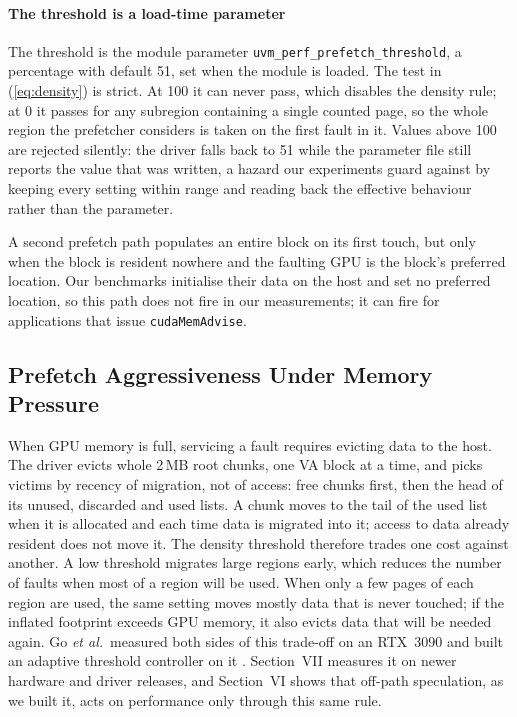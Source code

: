 \paragraph{The threshold is a load-time parameter}
The threshold is the module parameter \texttt{uvm\_perf\_prefetch\_threshold},
a percentage with default 51, set when the module is loaded. The test in
(\ref{eq:density}) is strict. At 100 it can never pass, which disables the
density rule; at 0 it passes for any subregion containing a single counted
page, so the whole region the prefetcher considers is taken on the first
fault in it. Values above 100 are rejected silently: the driver falls back to
51 while the parameter file still reports the value that was written, a
hazard our experiments guard against by keeping every setting within range
and reading back the effective behaviour rather than the parameter.

A second prefetch path populates an entire block on its first touch, but only
when the block is resident nowhere and the faulting GPU is the block's
preferred location. Our benchmarks initialise their data on the host and set
no preferred location, so this path does not fire in our measurements; it
can fire for applications that issue \texttt{cudaMemAdvise}.

\subsection{Prefetch Aggressiveness Under Memory Pressure}
\label{sec:bg-oversub}

When GPU memory is full, servicing a fault requires evicting data to the
host. The driver evicts whole 2\,MB root chunks, one VA block at a time, and
picks victims by recency of migration, not of access: free chunks first, then
the head of its unused, discarded and used lists. A chunk moves to the tail of
the used list when it is allocated and each time data is migrated into it;
access to data already resident does not move it. The density threshold
therefore trades one cost against another. A low threshold migrates large
regions early, which reduces the number of faults when most of a region will
be used. When only a few pages of each region are used, the same setting
moves mostly data that is never touched; if the inflated footprint exceeds
GPU memory, it also evicts data that will be needed again. Go
\emph{et al.}\ measured both sides of this trade-off on an RTX~3090 and built
an adaptive threshold controller on it \cite{go2023earlyadaptor}. Section~VII
measures it on newer hardware and driver releases, and Section~VI shows that
off-path speculation, as we built it, acts on performance only through this
same rule.


